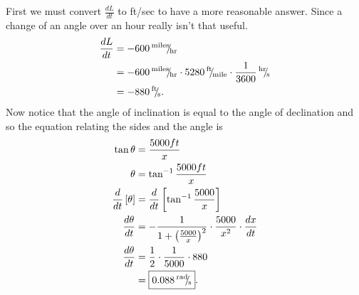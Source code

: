 \documentclass{hwset}
\begin{document}
\begin{solution}
	\begin{center}
	\end{center}
	First we must convert $\frac{dL}{dt}$ to ft/sec to have a more reasonable
	answer. Since a change of an angle over an hour really isn't that useful.
	\begin{align*}
		\frac{dL}{dt}&= -600 \sfrac{\text{miles}}{\text{hr}}\\
		&= -600 \sfrac{\text{miles}}{\text{hr}} \cdot 5280
			\sfrac{\text{ft}}{\text{mile}} \cdot \frac{1}{3600}
			\sfrac{\text{hr}}{\text{s}} \\
		&= -880 \sfrac{\text{ft}}{\text{s}}.
	\end{align*}
	Now notice that the angle of inclination is equal to the angle of declination
	and so the equation relating the sides and the angle is
	\begin{align*}
		\tan \theta &= \frac{5000 ft}{x}\\
		\theta &= \tan^{-1} \frac{5000 ft}{x}\\
		\frac{d}{dt}\left[ \theta \right] &= \frac{d}{dt}\left[ \tan^{-1}
			\frac{5000}{x} \right] \\
		\frac{d\theta}{dt} &= -\dfrac{1}{1 + \left(\frac{5000}{x}\right)^2}\cdot
			\frac{5000}{x^2}\cdot \frac{dx}{dt} \\
		\frac{d\theta}{dt} &= \frac{1}{2}\cdot \frac{1}{5000}\cdot 880 \\
		&= \boxed{ 0.088 \,^{\text{rad}}\!\!/\!_{\text{s}}}.
	\end{align*}
\end{solution}
\end{document}
